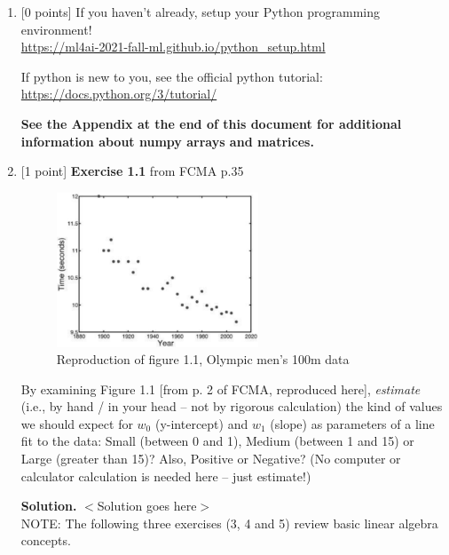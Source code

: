 \documentclass[10pt]{article}
\begin{document}
\begin{enumerate}


\item \label{prob:1} [0 points]
If you haven't already, setup your Python programming environment! \\
\url{https://ml4ai-2021-fall-ml.github.io/python_setup.html}

If python is new to you, see the official python tutorial:\\
\url{https://docs.python.org/3/tutorial/}

{\bf See the Appendix at the end of this document for additional information about numpy arrays and matrices.}

\vspace{0.5cm}


\item \label{prob:2} [1 point]
{\bf Exercise 1.1} from FCMA p.35

\begin{figure}[htb]
\begin{center}
\includegraphics[width=6cm]{figures/figure1-1_p2}
\caption{Reproduction of figure 1.1, Olympic men's 100m data}
\end{center}
\end{figure}
By examining Figure 1.1 [from p. 2 of FCMA, reproduced here], {\em estimate} (i.e., by hand / in your head -- not by rigorous calculation) the kind of values we should expect for $w_0$ (y-intercept) and $w_1$ (slope) as parameters of a line fit to the data: Small (between 0 and 1), Medium (between 1 and 15) or Large (greater than 15)? Also, Positive or Negative?  (No computer or calculator calculation is needed here -- just estimate!)

{\bf Solution.} $<$Solution goes here$>$\\



\newpage
NOTE: The following three exercises (3, 4 and 5) review basic linear algebra concepts.


\end{enumerate}
\end{document}
